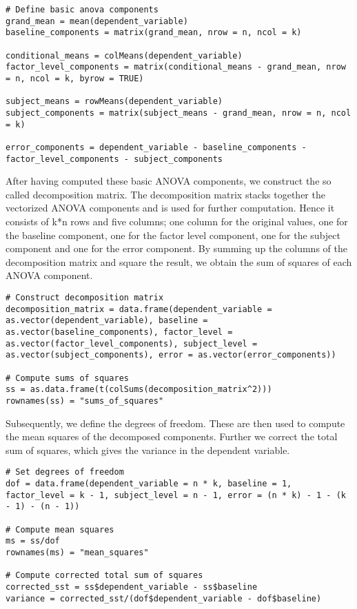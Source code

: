 \documentclass[11pt]{article}
\begin{document}
\begin{lstlisting}  
# Define basic anova components    
grand_mean = mean(dependent_variable)
baseline_components = matrix(grand_mean, nrow = n, ncol = k)
    
conditional_means = colMeans(dependent_variable)
factor_level_components = matrix(conditional_means - grand_mean, nrow = n, ncol = k, byrow = TRUE)
    
subject_means = rowMeans(dependent_variable)
subject_components = matrix(subject_means - grand_mean, nrow = n, ncol = k)
    
error_components = dependent_variable - baseline_components - factor_level_components - subject_components
\end{lstlisting}  
		
					After having computed these basic ANOVA components, we construct the so called decomposition matrix. The decomposition matrix stacks together the vectorized ANOVA components and is used for further computation. Hence it consists of k*n rows and five columns; one column for the original values, one for the baseline component, one for the factor level component, one for the subject component and one for the error component. By summing up the columns of the decomposition matrix and square the result, we obtain the sum of squares of each ANOVA component.\\
		
\begin{lstlisting}      
# Construct decomposition matrix     
decomposition_matrix = data.frame(dependent_variable = as.vector(dependent_variable), baseline = as.vector(baseline_components), factor_level = as.vector(factor_level_components), subject_level = as.vector(subject_components), error = as.vector(error_components))

# Compute sums of squares
ss = as.data.frame(t(colSums(decomposition_matrix^2)))
rownames(ss) = "sums_of_squares"
\end{lstlisting}      
    
					Subsequently, we define the degrees of freedom. These are then used to compute the mean squares of the decomposed components. Further we correct the total sum of squares, which gives the variance in the dependent variable.\\

\begin{lstlisting}
# Set degrees of freedom
dof = data.frame(dependent_variable = n * k, baseline = 1, factor_level = k - 1, subject_level = n - 1, error = (n * k) - 1 - (k - 1) - (n - 1))

# Compute mean squares
ms = ss/dof
rownames(ms) = "mean_squares"

# Compute corrected total sum of squares
corrected_sst = ss$dependent_variable - ss$baseline
variance = corrected_sst/(dof$dependent_variable - dof$baseline)
\end{lstlisting}   
    
\end{document}
